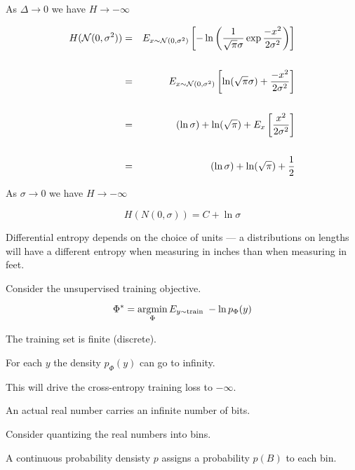 {\vfill
\centerline{As $\Delta \rightarrow 0$ we have $H \rightarrow -\infty$}


\hfill

{\huge
\begin{eqnarray*}
H({\cal N}(0,\sigma^2)) & = & E_{x \sim {\cal N}(0,\sigma^2)} \left[ -\ln \left(\frac{1}{\sqrt{\pi}\sigma} \exp{\frac{-x^2}{2\sigma^2}}\right)\right] \\
\\
& =& E_{x \sim {\cal N}(0,\sigma^2)} \left[ \ln (\sqrt{\pi}\sigma) + \frac{-x^2}{2\sigma^2}\right] \\
\\
& = & (\ln\sigma) + \ln(\sqrt{\pi}) + E_x \left[\frac{x^2}{2\sigma^2}\right] \\
\\
& = & (\ln\sigma) + \ln(\sqrt{\pi}) + \frac{1}{2} \\
\end{eqnarray*}
}

\vfill
\centerline{As $\sigma \rightarrow 0$ we have $H \rightarrow -\infty$}


$$H(N(0,\sigma)) = C + \ln \sigma$$

\vfill
Differential entropy depends on the choice of units --- a distributions on lengths will have a different entropy
when measuring in inches than when measuring in feet.


Consider the unsupervised training objective.

$$\Phi^* = \operatorname*{argmin}_\Phi E_{y \sim \mathrm{train}}\;-\ln p_\Phi(y)$$

\vfill
The training set is finite (discrete).

\vfill
For each $y$ the density $p_\Phi(y)$ can go to infinity.

\vfill
This will drive the cross-entropy training loss to $-\infty$.



An actual real number carries an infinite number of bits.

\vfill
Consider quantizing the real numbers into bins.

\vfill
A continuous probability densisty $p$ assigns a probability $p(B)$ to each bin.

}
